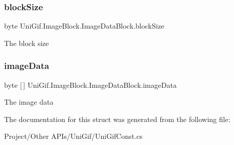 \subsubsection{\texorpdfstring{block\+Size}{blockSize}}
{\footnotesize\ttfamily byte Uni\+Gif.\+Image\+Block.\+Image\+Data\+Block.\+block\+Size}



The block size 

\mbox{\label{struct_uni_gif_1_1_image_block_1_1_image_data_block_a2a5c00f84fea5acf92b2bf324dcb440e}} 
\subsubsection{\texorpdfstring{image\+Data}{imageData}}
{\footnotesize\ttfamily byte \mbox{[}$\,$\mbox{]} Uni\+Gif.\+Image\+Block.\+Image\+Data\+Block.\+image\+Data}



The image data 



The documentation for this struct was generated from the following file\+:\begin{DoxyCompactItemize}
\item 
Project/\+Other A\+P\+Is/\+Uni\+Gif/Uni\+Gif\+Const.\+cs\end{DoxyCompactItemize}
